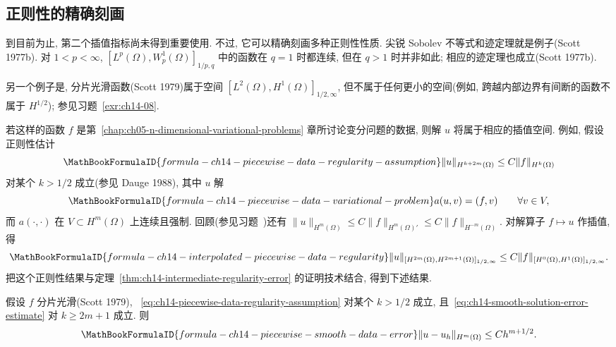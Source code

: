 \subsection{正则性的精确刻画}
\label{sec:ch14-precise-regularity-characterizations}
\setcounter{thmcount}{0}
\setcounter{equation}{0}

到目前为止, 第二个插值指标尚未得到重要使用. 不过, 它可以精确刻画多种正则性性质. 尖锐 Sobolev 不等式和迹定理就是例子(Scott 1977b). 对 $1<p<\infty$, $[L^p(\Omega),W_p^1(\Omega)]_{1/p,q}$ 中的函数在 $q=1$ 时都连续, 但在 $q>1$ 时并非如此; 相应的迹定理也成立(Scott 1977b).

另一个例子是, 分片光滑函数(Scott 1979)属于空间 $[L^2(\Omega),H^1(\Omega)]_{1/2,\infty}$, 但不属于任何更小的空间(例如, 跨越内部边界有间断的函数不属于 $H^{1/2}$); 参见习题~\ref{exr:ch14-08}.

若这样的函数 $f$ 是第~\ref{chap:ch05-n-dimensional-variational-problems} 章所讨论变分问题的数据, 则解 $u$ 将属于相应的插值空间. 例如, 假设正则性估计
\begin{equation}
\MathBookFormulaID{formula-ch14-piecewise-data-regularity-assumption}
\label{eq:ch14-piecewise-data-regularity-assumption}
\|u\|_{H^{k+2m}(\Omega)}\leq C\|f\|_{H^k(\Omega)}
\end{equation}
对某个 $k>1/2$ 成立(参见 Dauge 1988), 其中 $u$ 解
\[
\MathBookFormulaID{formula-ch14-piecewise-data-variational-problem}
a(u,v)=(f,v)\qquad\forall v\in V,
\]
而 $a(\cdot,\cdot)$ 在 $V\subset H^m(\Omega)$ 上连续且强制. 回顾(参见习题~)还有
$\|u\|_{H^m(\Omega)}\leq C\|f\|_{H^m(\Omega)'}\leq C\|f\|_{H^{-m}(\Omega)}$. 对解算子 $f\mapsto u$ 作插值, 得
\begin{equation}
\MathBookFormulaID{formula-ch14-interpolated-piecewise-data-regularity}
\label{eq:ch14-interpolated-piecewise-data-regularity}
\|u\|_{[H^{2m}(\Omega),H^{2m+1}(\Omega)]_{1/2,\infty}}
\leq C\|f\|_{[H^0(\Omega),H^1(\Omega)]_{1/2,\infty}}.
\end{equation}
把这个正则性结果与定理~\ref{thm:ch14-intermediate-regularity-error} 的证明技术结合, 得到下述结果.

\begin{Theorem}
\label{thm:ch14-piecewise-smooth-data-error}
假设 $f$ 分片光滑(Scott 1979), ~\eqref{eq:ch14-piecewise-data-regularity-assumption} 对某个 $k>1/2$ 成立, 且~\eqref{eq:ch14-smooth-solution-error-estimate} 对 $k\geq2m+1$ 成立. 则
\[
\MathBookFormulaID{formula-ch14-piecewise-smooth-data-error}
\|u-u_h\|_{H^m(\Omega)}\leq Ch^{m+1/2}.
\]
\end{Theorem}
